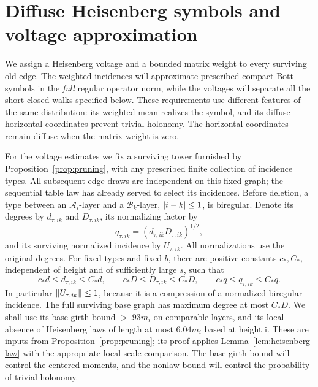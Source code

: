 \section{Diffuse Heisenberg symbols and voltage approximation}
\label{sec:analysis}

We assign a Heisenberg voltage and a bounded matrix weight to every surviving
old edge.  The weighted incidences will approximate prescribed compact Bott
symbols in the \emph{full} regular operator norm, while the voltages will
separate all the short closed walks specified below.  These requirements use
different features of the same distribution: its weighted mean realizes the
symbol, and its diffuse horizontal coordinates prevent trivial holonomy.
The horizontal coordinates remain diffuse when the matrix weight is zero.

For the voltage estimates we fix a surviving tower furnished by
Proposition~\ref{prop:pruning}, with any prescribed finite collection of
incidence types.  All subsequent edge draws are independent on this fixed
graph; the sequential table law has already served to select its incidences.
Before deletion, a type between an
\(\mathscr A_i\)-layer and a \(\mathscr B_k\)-layer, \(\left\lvert i-k\right\rvert\leq1\), is
biregular.  Denote its degrees by \(d_{\tau,ik}\) and \(D_{\tau,ik}\), its
normalizing factor by
\[
 q_{\tau,ik}=(d_{\tau,ik}D_{\tau,ik})^{1/2},
\]
and its surviving normalized incidence by \(U_{\tau,ik}\).  All normalizations
use the original degrees.  For fixed types and fixed \(b\), there are positive
constants \(c_*,C_*\), independent of height and of sufficiently large \(s\),
such that
\begin{equation}
\label{eq:analysis-degree-bounds}
 c_*d\leq d_{\tau,ik}\leq C_*d,\qquad
 c_*D\leq D_{\tau,ik}\leq C_*D,\qquad
 c_*q\leq q_{\tau,ik}\leq C_*q.
\end{equation}
In particular \(\left\lVert U_{\tau,ik}\right\rVert\leq1\), because it is a compression of a
normalized biregular incidence.  The full surviving base graph has maximum
degree at most \(C_*D\).  We shall use its base-girth bound \(>.93m_i\) on
comparable layers, and its local absence of Heisenberg laws of length at most
\(6.04m_i\) based at height i.  These are inputs from
Proposition~\ref{prop:pruning}; its proof applies
Lemma~\ref{lem:heisenberg-law} with the appropriate local scale comparison.
The base-girth bound will control the centered moments, and the nonlaw bound
will control the probability of trivial holonomy.

